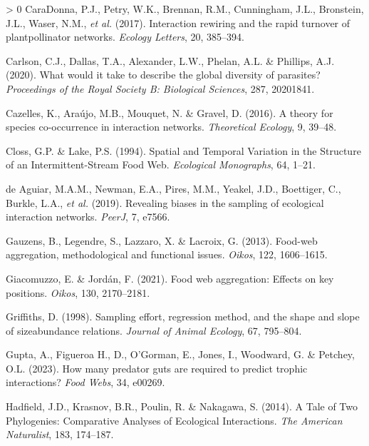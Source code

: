 \documentclass[11pt]{article}
\newlength{\cslhangindent}
\newenvironment{CSLReferences}[3] %
 {%
  \setlength{\parindent}{0pt}
  \ifodd #1 \everypar{\setlength{\hangindent}{\cslhangindent}}\ignorespaces\fi
  \ifnum #2 > 0
  \setlength{\parskip}{#2\baselineskip}
  \fi
 }%
 {}
\begin{document}
\begin{CSLReferences}{1}{0}
\leavevmode\hypertarget{ref-CaraDonna2017IntRew}{}%
CaraDonna, P.J., Petry, W.K., Brennan, R.M., Cunningham, J.L.,
Bronstein, J.L., Waser, N.M., \emph{et al.} (2017). Interaction rewiring
and the rapid turnover of plantpollinator networks. \emph{Ecology
Letters}, 20, 385--394.

\leavevmode\hypertarget{ref-Carlson2020WhaWou}{}%
Carlson, C.J., Dallas, T.A., Alexander, L.W., Phelan, A.L. \& Phillips,
A.J. (2020). What would it take to describe the global diversity of
parasites? \emph{Proceedings of the Royal Society B: Biological
Sciences}, 287, 20201841.

\leavevmode\hypertarget{ref-Cazelles2016TheSpe}{}%
Cazelles, K., Araújo, M.B., Mouquet, N. \& Gravel, D. (2016). A theory
for species co-occurrence in interaction networks. \emph{Theoretical
Ecology}, 9, 39--48.

\leavevmode\hypertarget{ref-Closs1994SpaTem}{}%
Closs, G.P. \& Lake, P.S. (1994). Spatial and Temporal Variation in the
Structure of an Intermittent-Stream Food Web. \emph{Ecological
Monographs}, 64, 1--21.

\leavevmode\hypertarget{ref-deAguiar2019RevBia}{}%
de Aguiar, M.A.M., Newman, E.A., Pires, M.M., Yeakel, J.D., Boettiger,
C., Burkle, L.A., \emph{et al.} (2019). Revealing biases in the sampling
of ecological interaction networks. \emph{PeerJ}, 7, e7566.

\leavevmode\hypertarget{ref-Gauzens2013FooAgg}{}%
Gauzens, B., Legendre, S., Lazzaro, X. \& Lacroix, G. (2013). Food-web
aggregation, methodological and functional issues. \emph{Oikos}, 122,
1606--1615.

\leavevmode\hypertarget{ref-Giacomuzzo2021FooWeb}{}%
Giacomuzzo, E. \& Jordán, F. (2021). Food web aggregation: Effects on
key positions. \emph{Oikos}, 130, 2170--2181.

\leavevmode\hypertarget{ref-Griffiths1998SamEff}{}%
Griffiths, D. (1998). Sampling effort, regression method, and the shape
and slope of sizeabundance relations. \emph{Journal of Animal Ecology},
67, 795--804.

\leavevmode\hypertarget{ref-Gupta2023HowMan}{}%
Gupta, A., Figueroa H., D., O'Gorman, E., Jones, I., Woodward, G. \&
Petchey, O.L. (2023). How many predator guts are required to predict
trophic interactions? \emph{Food Webs}, 34, e00269.

\leavevmode\hypertarget{ref-Hadfield2014TalTwo}{}%
Hadfield, J.D., Krasnov, B.R., Poulin, R. \& Nakagawa, S. (2014). A Tale
of Two Phylogenies: Comparative Analyses of Ecological Interactions.
\emph{The American Naturalist}, 183, 174--187.


\end{CSLReferences}
\end{document}
